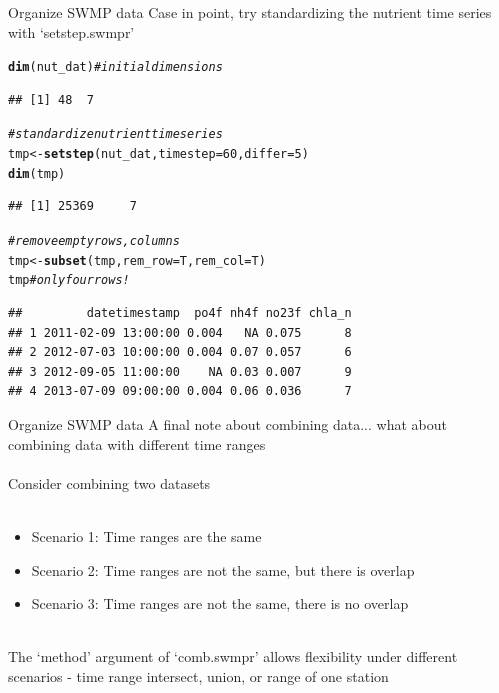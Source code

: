 \documentclass[xcolor=svgnames]{beamer}\usepackage[]{graphicx}\usepackage[]{color}
\makeatletter
\newcommand{\hlnum}[1]{\textcolor[rgb]{0.686,0.059,0.569}{#1}}%
\newcommand{\hlcom}[1]{\textcolor[rgb]{0.678,0.584,0.686}{\textit{#1}}}%
\newcommand{\hlstd}[1]{\textcolor[rgb]{0.345,0.345,0.345}{#1}}%
\newcommand{\hlkwb}[1]{\textcolor[rgb]{0.69,0.353,0.396}{#1}}%
\newcommand{\hlkwc}[1]{\textcolor[rgb]{0.333,0.667,0.333}{#1}}%
\newcommand{\hlkwd}[1]{\textcolor[rgb]{0.737,0.353,0.396}{\textbf{#1}}}%
\newenvironment{kframe}{%
 \def\at@end@of@kframe{}%
 \ifinner\ifhmode%
  \def\at@end@of@kframe{\end{minipage}}%
  \begin{minipage}{\columnwidth}%
 \fi\fi%
 \def\FrameCommand##1{\hskip\@totalleftmargin \hskip-\fboxsep
 \colorbox{shadecolor}{##1}\hskip-\fboxsep
     \hskip-\linewidth \hskip-\@totalleftmargin \hskip\columnwidth}%
 \MakeFramed {\advance\hsize-\width
   \@totalleftmargin\z@ \linewidth\hsize
   \@setminipage}}%
 {\par\unskip\endMakeFramed%
 \at@end@of@kframe}
\newenvironment{knitrout}{}{} %
\makeatother
\begin{document}
\begin{frame}[containsverbatim]{Organize SWMP data}
Case in point, try standardizing the nutrient time series with `setstep.swmpr'
\begin{knitrout}\scriptsize
{}\color{fgcolor}\begin{kframe}
\begin{alltt}
\hlkwd{dim}\hlstd{(nut_dat)} \hlcom{# initial dimensions}
\end{alltt}
\begin{verbatim}
## [1] 48  7
\end{verbatim}
\begin{alltt}
\hlcom{# standardize nutrient time series}
\hlstd{tmp} \hlkwb{<-} \hlkwd{setstep}\hlstd{(nut_dat,} \hlkwc{timestep} \hlstd{=} \hlnum{60}\hlstd{,} \hlkwc{differ} \hlstd{=} \hlnum{5}\hlstd{)}
\hlkwd{dim}\hlstd{(tmp)}
\end{alltt}
\begin{verbatim}
## [1] 25369     7
\end{verbatim}
\begin{alltt}
\hlcom{# remove empty rows, columns}
\hlstd{tmp} \hlkwb{<-} \hlkwd{subset}\hlstd{(tmp,} \hlkwc{rem_row} \hlstd{= T,} \hlkwc{rem_col} \hlstd{= T)}
\hlstd{tmp} \hlcom{#only four rows!}
\end{alltt}
\begin{verbatim}
##         datetimestamp  po4f nh4f no23f chla_n
## 1 2011-02-09 13:00:00 0.004   NA 0.075      8
## 2 2012-07-03 10:00:00 0.004 0.07 0.057      6
## 3 2012-09-05 11:00:00    NA 0.03 0.007      9
## 4 2013-07-09 09:00:00 0.004 0.06 0.036      7
\end{verbatim}
\end{kframe}
\end{knitrout}
\end{frame}

\begin{frame}[containsverbatim]{Organize SWMP data}
A final note about combining data... what about combining data with different \alert{time ranges}\\~\\
Consider combining two datasets \\~\\
\begin{itemize}
\item \alert{Scenario 1}: Time ranges are the same
\item \alert{Scenario 2}: Time ranges are not the same, but there is overlap
\item \alert{Scenario 3}: Time ranges are not the same, there is no overlap \\~\\
\end{itemize}
The `method' argument of `comb.swmpr' allows flexibility under different scenarios - time range intersect, union, or range of one station
\end{frame}
\end{document}
